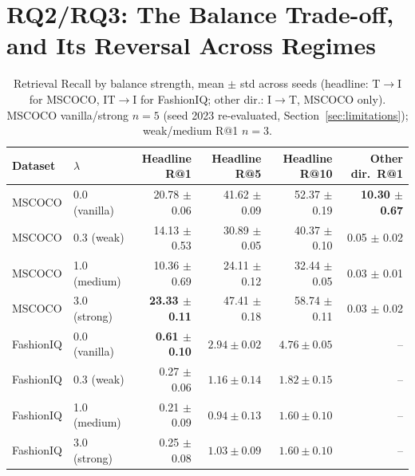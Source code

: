 \section{RQ2/RQ3: The Balance Trade-off, and Its Reversal Across Regimes}
\label{sec:rq2rq3}

\begin{table}[t]
\centering
\caption{Retrieval Recall by balance strength, mean $\pm$ std across seeds (headline: T$\to$I for MSCOCO, IT$\to$I for FashionIQ; other dir.: I$\to$T, MSCOCO only). MSCOCO vanilla/strong $n{=}5$ (seed 2023 re-evaluated, Section~\ref{sec:limitations}); weak/medium R@1 $n{=}3$.}
\label{tab:table2}
\scriptsize
\setlength{\tabcolsep}{3.2pt}
\begin{tabular}{@{}llrrrr@{}}
\toprule
Dataset & $\lambda$ & Headline R@1 & Headline R@5 & Headline R@10 & Other dir.\ R@1 \\
\midrule
MSCOCO & 0.0 (vanilla) & 20.78 $\pm$ 0.06 & 41.62 $\pm$ 0.09 & 52.37 $\pm$ 0.19 & \textbf{10.30 $\pm$ 0.67} \\
MSCOCO & 0.3 (weak)    & 14.13 $\pm$ 0.53 & 30.89 $\pm$ 0.05 & 40.37 $\pm$ 0.10 & 0.05 $\pm$ 0.02 \\
MSCOCO & 1.0 (medium)  & 10.36 $\pm$ 0.69 & 24.11 $\pm$ 0.12 & 32.44 $\pm$ 0.05 & 0.03 $\pm$ 0.01 \\
MSCOCO & 3.0 (strong)  & \textbf{23.33 $\pm$ 0.11} & 47.41 $\pm$ 0.18 & 58.74 $\pm$ 0.11 & 0.03 $\pm$ 0.02 \\
\midrule
FashionIQ & 0.0 (vanilla) & \textbf{0.61 $\pm$ 0.10} & $2.94\pm0.02$ & $4.76\pm0.05$ & -- \\
FashionIQ & 0.3 (weak)    & 0.27 $\pm$ 0.06 & $1.16\pm0.14$ & $1.82\pm0.15$ & -- \\
FashionIQ & 1.0 (medium)  & 0.21 $\pm$ 0.09 & $0.94\pm0.13$ & $1.60\pm0.10$ & -- \\
FashionIQ & 3.0 (strong)  & 0.25 $\pm$ 0.08 & $1.03\pm0.09$ & $1.60\pm0.10$ & -- \\
\bottomrule
\end{tabular}
\end{table}

